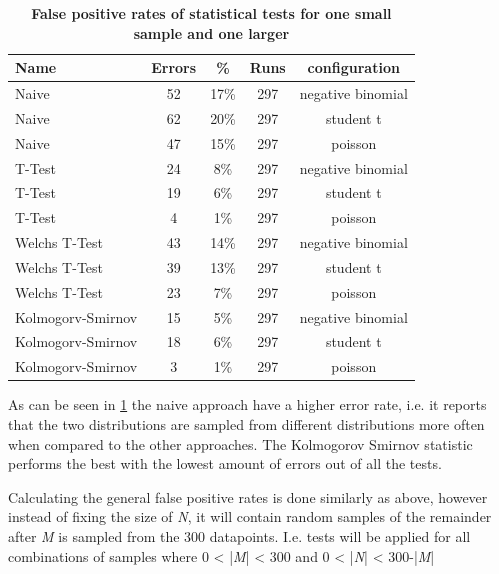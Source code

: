 \begin{table}[htp]
  \centering
  \begin{tabular}{lcccc} %
    {\bf Name}        & {\bf Errors} & {\bf \%} & {\bf Runs} & {\bf configuration} \\
    \hline %
    Naive             & 52           & 17\%     & 297        & negative binomial   \\
    Naive             & 62           & 20\%     & 297        & student t           \\
    Naive             & 47           & 15\%     & 297        & poisson             \\
    \hline
    T-Test            & 24           & 8\%      & 297        & negative binomial   \\
    T-Test            & 19           & 6\%      & 297        & student t           \\
    T-Test            & 4            & 1\%      & 297        & poisson             \\
    \hline
    Welchs T-Test     & 43           & 14\%     & 297        & negative binomial   \\
    Welchs T-Test     & 39           & 13\%     & 297        & student t           \\
    Welchs T-Test     & 23           & 7\%      & 297        & poisson             \\
    \hline
    Kolmogorv-Smirnov & 15           & 5\%      & 297        & negative binomial   \\
    Kolmogorv-Smirnov & 18           & 6\%      & 297        & student t           \\
    Kolmogorv-Smirnov & 3            & 1\%      & 297        & poisson             \\
    \hline
  \end{tabular}
  \caption{\textbf{False positive rates of statistical tests for one small sample and one larger}}
  \label{fig:false_positives}
\end{table}

As can be seen in \ref{fig:false_positives} the naive approach have a higher error rate, i.e. it reports that the two distributions are sampled from different distributions more often when compared to the other approaches. The Kolmogorov Smirnov statistic performs the best with the lowest amount of errors out of all the tests.

Calculating the general false positive rates is done similarly as above, however instead of fixing the size of \emph{N}, it will contain random samples of the remainder after \emph{M} is sampled from the 300 datapoints. I.e. tests will be applied for all combinations of samples where 0 < |\emph{M}| < 300 and 0 < |\emph{N}| < 300-|\emph{M}|


